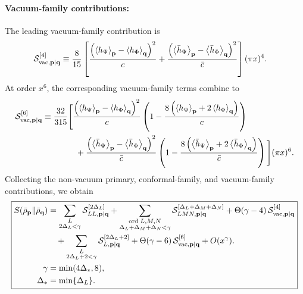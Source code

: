 \documentclass[11pt]{article}
\newcommand{\nn}{\nonumber}
\begin{document}
\paragraph{Vacuum-family contributions:} The leading vacuum-family contribution is
\begin{align}
    \mathcal S_{{\rm vac},\mathbf p|\mathbf q}^{[4]}
    &\equiv
    \frac{8}{15}
    \left[
    \frac{
    \left(
    \left\langle h_\Psi\right\rangle_{\mathbf p}
    -
    \left\langle h_\Phi\right\rangle_{\mathbf q}
    \right)^2
    }{c}
    +
    \frac{
    \left(
    \left\langle \bar h_\Psi\right\rangle_{\mathbf p}
    -
    \left\langle \bar h_\Phi\right\rangle_{\mathbf q}
    \right)^2
    }{\bar c}
    \right]
    (\pi x)^4 .
\end{align}
At order $x^6$, the corresponding vacuum-family terms combine to
\begin{align}
    \mathcal S_{{\rm vac},\mathbf p|\mathbf q}^{[6]}
    &\equiv
    \frac{32}{315}
    \Bigg[
    \frac{
    \left(
    \left\langle h_\Psi\right\rangle_{\mathbf p}
    -
    \left\langle h_\Phi\right\rangle_{\mathbf q}
    \right)^2
    }{c}
    \left(
    1-
    \frac{
    8\left(
    \left\langle h_\Psi\right\rangle_{\mathbf p}
    +
    2\left\langle h_\Phi\right\rangle_{\mathbf q}
    \right)
    }{c}
    \right)
    \nn\\
    &\qquad\qquad
    +
    \frac{
    \left(
    \left\langle \bar h_\Psi\right\rangle_{\mathbf p}
    -
    \left\langle \bar h_\Phi\right\rangle_{\mathbf q}
    \right)^2
    }{\bar c}
    \left(
    1-
    \frac{
    8\left(
    \left\langle \bar h_\Psi\right\rangle_{\mathbf p}
    +
    2\left\langle \bar h_\Phi\right\rangle_{\mathbf q}
    \right)
    }{\bar c}
    \right)
    \Bigg]
    (\pi x)^6 .
\end{align}
Collecting the non-vacuum primary, conformal-family, and vacuum-family
contributions, we obtain
\begin{align}
\boxed{
\begin{aligned}
S(\bar\rho_{\mathbf p}\|\bar\rho_{\mathbf q})
&=
\sum_{\substack{L\\2\Delta_L<\gamma}}
\mathcal S_{LL,\mathbf p|\mathbf q}^{[2\Delta_L]}
+
\sum_{\substack{{\rm ord}\;L,M,N\\
\Delta_L+\Delta_M+\Delta_N<\gamma}}
\mathcal S_{LMN,\mathbf p|\mathbf q}^{[\Delta_L+\Delta_M+\Delta_N]}
+
\Theta(\gamma-4)\,
\mathcal S_{{\rm vac},\mathbf p|\mathbf q}^{[4]}
\nn\\
&\quad+
\sum_{\substack{L\\2\Delta_L+2<\gamma}}
\mathcal S_{L,\mathbf p|\mathbf q}^{[2\Delta_L+2]}
+
\Theta(\gamma-6)\,
\mathcal S_{{\rm vac},\mathbf p|\mathbf q}^{[6]}
+
O(x^\gamma).
\\
\gamma &= \min(4\Delta_*,8),
\\
\Delta_* &= \min\{\Delta_L\}.
\end{aligned}}
\end{align}
\end{document}
